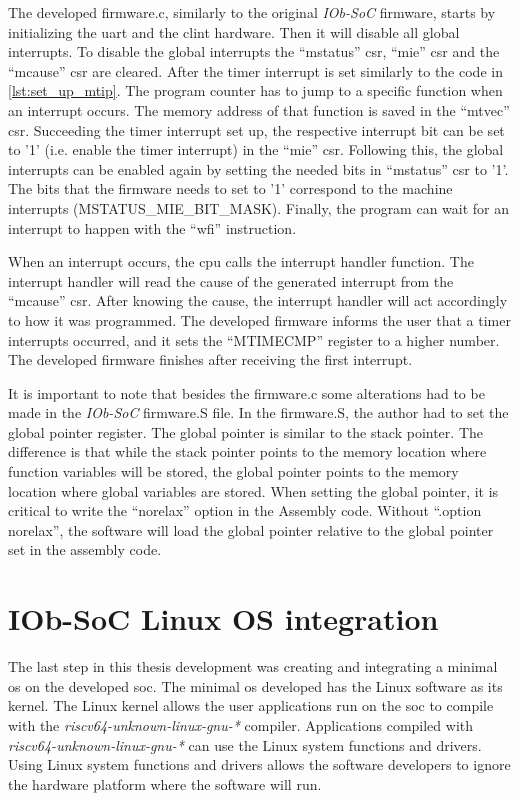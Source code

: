 The developed firmware.c, similarly to the original \textit{IOb-SoC} firmware, starts by initializing the \acrshort{uart} and the \acrshort{clint} hardware. Then it will disable all global interrupts. To disable the global interrupts the \enquote{mstatus} \acrshort{csr}, \enquote{mie} \acrshort{csr} and the \enquote{mcause} \acrshort{csr} are cleared. After the timer interrupt is set similarly to the code in \ref{lst:set_up_mtip}. The program counter has to jump to a specific function when an interrupt occurs. The memory address of that function is saved in the \enquote{mtvec} \acrshort{csr}. Succeeding the timer interrupt set up, the respective interrupt bit can be set to '1' (i.e. enable the timer interrupt) in the \enquote{mie} \acrshort{csr}. Following this, the global interrupts can be enabled again by setting the needed bits in \enquote{mstatus} \acrshort{csr} to '1'. The bits that the firmware needs to set to '1' correspond to the machine interrupts (MSTATUS\_MIE\_BIT\_MASK). Finally, the program can wait for an interrupt to happen with the \enquote{wfi} instruction.

When an interrupt occurs, the \acrshort{cpu} calls the interrupt handler function. The interrupt handler will read the cause of the generated interrupt from the \enquote{mcause} \acrshort{csr}. After knowing the cause, the interrupt handler will act accordingly to how it was programmed. The developed firmware informs the user that a timer interrupts occurred, and it sets the \enquote{MTIMECMP} register to a higher number. The developed firmware finishes after receiving the first interrupt.

It is important to note that besides the firmware.c some alterations had to be made in the \textit{IOb-SoC} firmware.S file. In the firmware.S, the author had to set the global pointer register. The global pointer is similar to the stack pointer. The difference is that while the stack pointer points to the memory location where function variables will be stored, the global pointer points to the memory location where global variables are stored. When setting the global pointer, it is critical to write the \enquote{norelax} option in the Assembly code. Without \enquote{.option norelax}, the software will load the global pointer relative to the global pointer set in the assembly code.

\section{IOb-SoC Linux OS integration}
\label{section:linux_os_integration}
The last step in this thesis development was creating and integrating a minimal \acrfull{os} on the developed \acrfull{soc}. The minimal \acrshort{os} developed has the Linux software as its kernel. The Linux kernel allows the user applications run on the \acrshort{soc} to compile with the \textit{riscv64-unknown-linux-gnu-*} compiler. Applications compiled with \textit{riscv64-unknown-linux-gnu-*} can use the Linux system functions and drivers. Using Linux system functions and drivers allows the software developers to ignore the hardware platform where the software will run.

